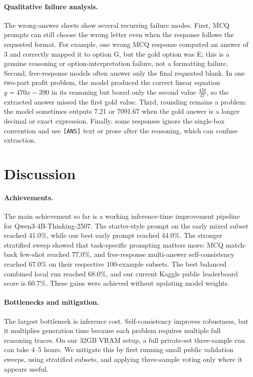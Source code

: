 \documentclass{article}
\newcommand{\model}{Qwen3-4B-Thinking-2507}
\begin{document}
\paragraph{Qualitative failure analysis.}
The wrong-answer sheets show several recurring failure modes. First, MCQ prompts can still choose the wrong letter even when the response follows the requested format. For example, one wrong MCQ response computed an answer of 3 and correctly mapped it to option G, but the gold option was E; this is a genuine reasoning or option-interpretation failure, not a formatting failure. Second, free-response models often answer only the final requested blank. In one two-part profit problem, the model produced the correct linear equation $y=470x-390$ in its reasoning but boxed only the second value $\frac{456}{47}$, so the extracted answer missed the first gold value. Third, rounding remains a problem: the model sometimes outputs 7.21 or 7091.67 when the gold answer is a longer decimal or exact expression. Finally, some responses ignore the single-box convention and use \texttt{[ANS]} text or prose after the reasoning, which can confuse extraction.

\section{Discussion}
\label{sec:discussion}

\paragraph{Achievements.}
The main achievement so far is a working inference-time improvement pipeline for \model. The starter-style prompt on the early mixed subset reached 41.0\%, while our best early prompt reached 44.0\%. The stronger stratified sweep showed that task-specific prompting matters more: MCQ match-back few-shot reached 77.0\%, and free-response multi-answer self-consistency reached 67.0\% on their respective 100-example subsets. The best balanced combined local run reached 68.0\%, and our current Kaggle public leaderboard score is 60.7\%. These gains were achieved without updating model weights.

\paragraph{Bottlenecks and mitigation.}
The largest bottleneck is inference cost. Self-consistency improves robustness, but it multiplies generation time because each problem requires multiple full reasoning traces. On our 32GB VRAM setup, a full private-set three-sample run can take 4--5 hours. We mitigate this by first running small public validation sweeps, using stratified subsets, and applying three-sample voting only where it appears useful.
\end{document}
